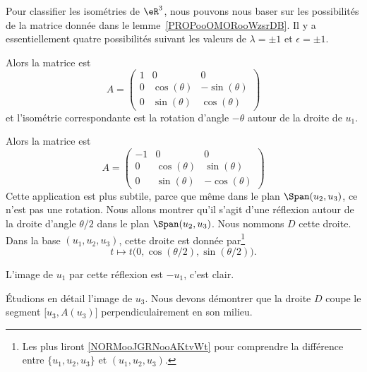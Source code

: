 Pour classifier les isométries de \( \eR^3\), nous pouvons nous baser sur les possibilités de la matrice donnée dans le lemme~\ref{PROPooOMORooWzsrDB}. Il y a essentiellement quatre possibilités suivant les valeurs de \( \lambda=\pm 1\) et \( \epsilon=\pm 1\).

\begin{subproof}
	\spitem[Si \( \epsilon=\lambda=1\)] Alors la matrice est
	\begin{equation}
		A=\begin{pmatrix}
			1 & 0            & 0             \\
			0 & \cos(\theta) & -\sin(\theta) \\
			0 & \sin(\theta) & \cos(\theta)
		\end{pmatrix}
	\end{equation}
	et l'isométrie correspondante est la rotation d'angle \( -\theta\) autour de la droite de \( u_1\).

	\spitem[Si \( \epsilon=\lambda=-1\)]
	Alors la matrice est
	\begin{equation}
		A=\begin{pmatrix}
			-1 & 0            & 0             \\
			0  & \cos(\theta) & \sin(\theta)  \\
			0  & \sin(\theta) & -\cos(\theta)
		\end{pmatrix}
	\end{equation}
	Cette application est plus subtile, parce que même dans le plan \( \Span(u_2,u_3)\), ce n'est pas une rotation. Nous allons montrer qu'il s'agit d'une réflexion autour de la droite d'angle \( \theta/2\) dans le plan \( \Span(u_2,u_3)\). Nous nommons \( D\) cette droite. Dans la base \( (u_1,u_2,u_3)\), cette droite est donnée par\footnote{Les plus  liront \ref{NORMooJGRNooAKtvWt} pour comprendre la différence entre \( \{ u_1, u_2, u_3 \}\) et \( (u_1,u_2,u_3)\).}
	\begin{equation}
		t\mapsto t\big( 0,\cos(\theta/2),\sin(\theta/2) \big).
	\end{equation}

	L'image de \( u_1\) par cette réflexion est \(-u_1\), c'est clair.

	Étudions en détail l'image de \( u_3\). Nous devons démontrer que la droite \( D\) coupe le segment \( \mathopen[ u_3 , A(u_3) \mathclose]\) perpendiculairement en son milieu.


\end{subproof}

